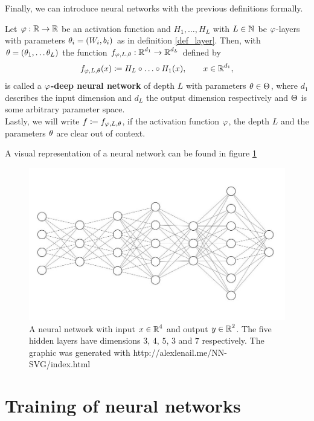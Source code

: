 Finally, we can introduce neural networks with the previous definitions formally.

\begin{definition}
Let $\operatorname{\varphi}: \operatorname{\mathbb{R}} \to \operatorname{\mathbb{R}}$ be an activation function and $H_1, \ldots, H_L$ with $L \in \operatorname{\mathbb{N}}$ be $\operatorname{\varphi}$-layers with parameters $\theta_i = (W_i, b_i)$ as in definition \ref{def_layer}. Then, with $\theta = (\theta_1, \ldots \theta_L)$ the function $f_{\operatorname{\varphi}, L, \theta}: \operatorname{\mathbb{R}}^{d_1} \to \operatorname{\mathbb{R}}^{d_L}$ defined by
\begin{align}
f_{\operatorname{\varphi}, L, \theta} (x) \coloneqq H_L \circ \ldots \circ H_1 (x), \qquad x \in \operatorname{\mathbb{R}}^{d_1},
\end{align}
is called a \textbf{$\operatorname{\varphi}$-deep neural network} of depth $L$ with parameters $\theta \in \operatorname{\Theta}$, where $d_1$ describes the input dimension and $d_L$ the output dimension respectively and $\operatorname{\Theta}$ is some arbitrary parameter space.\\
Lastly, we will write $f\coloneqq f_{\operatorname{\varphi}, L, \theta}$, if the activation function $\operatorname{\varphi}$, the depth $L$ and the parameters $\theta$ are clear out of context.
\end{definition}

A visual representation of a neural network can be found in figure \ref{img_nn}

\begin{figure}
\begin{center}
   \begin{minipage}[b]{\linewidth}
      \includegraphics[width=\linewidth]{neural_net}
      \caption{A neural network with input $x\in \operatorname{\mathbb{R}}^4$ and output $y\in\operatorname{\mathbb{R}}^2$. The five hidden layers have dimensions $3$, $4$, $5$, $3$ and $7$ respectively. The graphic was generated with http://alexlenail.me/NN-SVG/index.html}\label{img_nn}
	\end{minipage}
\end{center}
\end{figure}



\section{Training of neural networks}
